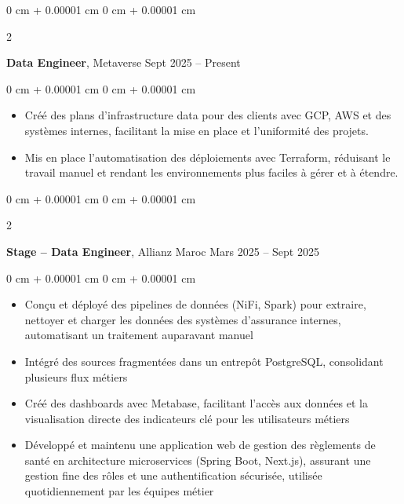 \documentclass[10pt, letterpaper]{article}
\newenvironment{highlights}{
    \begin{itemize}[
        topsep=0.10 cm,
        parsep=0.10 cm,
        partopsep=0pt,
        itemsep=0pt,
        leftmargin=0 cm + 10pt
    ]
}{
    \end{itemize}
} %
\newenvironment{onecolentry}{
    \begin{adjustwidth}{
        0 cm + 0.00001 cm
    }{
        0 cm + 0.00001 cm
    }
}{
    \end{adjustwidth}
} %
\newenvironment{twocolentry}[2][]{
    \onecolentry
    \def\secondColumn{#2}
    \setcolumnwidth{\fill, 4.5 cm}
    \begin{paracol}{2}
}{
    \switchcolumn \raggedleft \secondColumn
    \end{paracol}
    \endonecolentry
} %
\begin{document}
    \begin{twocolentry}{
            Sept 2025 –  Present
        }
            \textbf{Data Engineer}, Metaverse \end{twocolentry}

        \vspace{0.10 cm}
        \begin{onecolentry}
            \begin{highlights}
\item Créé des plans d’infrastructure data pour des clients avec GCP, AWS et des systèmes internes, facilitant la mise en place et l’uniformité des projets.  
\item Mis en place l’automatisation des déploiements avec Terraform, réduisant le travail manuel et rendant les environnements plus faciles à gérer et à étendre.  



            \end{highlights}
        \end{onecolentry}


        \vspace{0.2 cm}
        
        \begin{twocolentry}{
            Mars 2025 – Sept 2025
        }
            \textbf{Stage – Data Engineer}, Allianz Maroc \end{twocolentry}

        \vspace{0.10 cm}
        \begin{onecolentry}
            \begin{highlights}
                \item Conçu et déployé des pipelines de données (NiFi, Spark) pour extraire, nettoyer et charger les données des systèmes d’assurance internes, automatisant un traitement auparavant manuel
                \item Intégré des sources fragmentées dans un entrepôt PostgreSQL, consolidant plusieurs flux métiers
                \item Créé des dashboards avec Metabase, facilitant l’accès aux données et la visualisation directe des indicateurs clé pour les utilisateurs métiers
                \item Développé et maintenu une application web de gestion des règlements de santé en architecture microservices (Spring Boot, Next.js), assurant une gestion fine des rôles et une authentification sécurisée, utilisée quotidiennement par les équipes métier

            \end{highlights}
        \end{onecolentry}
\end{document}
